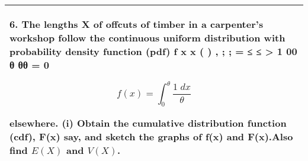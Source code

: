 \documentclass[a4paper,12pt]{article}
\begin{document}
\begin{table}[ht!]
 \centering
 \begin{tabular}{|p{15cm}|}
 \hline
6. The lengths X of offcuts of timber in a carpenter’s workshop follow the continuous uniform distribution with probability density function (pdf)
f x x ( ) , ; ; = ≤ ≤ > 1 00 θ θθ  = 0  

\[f(x) = \int^{\theta}_{0} \frac{1\;dx}{\theta} \]


elsewhere.
(i) Obtain the cumulative distribution function (cdf), F(x) say, and sketch the graphs of
f(x) and F(x).Also find $E(X)$ and $V(X)$.

\\ \hline
  \end{tabular}
\end{table}

 
\end{document}
